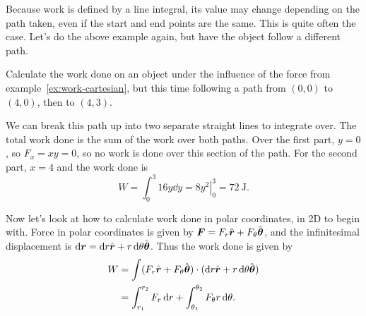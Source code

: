 \documentclass[../classical_mechanics.tex]{subfiles}
\begin{document}
        Because work is defined by a line integral, its value may change depending on the path taken, even if the start and end points are the same.
        This is quite often the case.
        Let's do the above example again, but have the object follow a different path.
        \begin{example}
            Calculate the work done on an object under the influence of the force from example~\ref{ex:work-cartesian}, but this time following a path from $(0,0)$ to $(4,0)$, then to $(4,3)$.

            We can break this path up into two separate straight lines to integrate over.
            The total work done is the sum of the work over both paths.
            Over the first part, $y=0$, so $F_x=xy=0$, so no work is done over this section of the path.
            For the second part, $x=4$ and the work done is
            \begin{equation}
                W=\int_0^3 16y\dd{y}=\left.8y^2\right|_0^3=\qty{72}{\joule}.
            \end{equation}
        \end{example}

        Now let's look at how to calculate work done in polar coordinates, in 2D to begin with.
        Force in polar coordinates is given by $\boldsymbol{F}=F_r\hat{\boldsymbol{r}}+F_\theta\hat{\boldsymbol{\theta}}$, and the infinitesimal displacement is $\dd{\vec{r}}=\dd{r}\uvec{r}+r\dd{\theta}\uvec{\theta}$.
        Thus the work done is given by
        \begin{align}
            W&=\int(F_r\uvec{r}+F_\theta\uvec{\theta})\cdot(\dd{r}\uvec{r}+r\dd{\theta}\uvec{\theta})\\
            &=\int_{r_1}^{r_2}F_r\dd{r}+\int_{\theta_1}^{\theta_2}F_\theta r\dd{\theta}\label{eq:work-integral-2d-polar}.
        \end{align}
        \begin{example}\label{ex:work-polar}
            
        \end{example}
\end{document}
